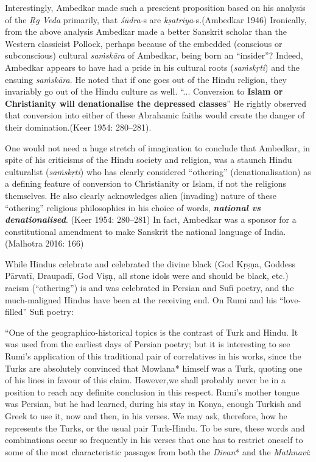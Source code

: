 Interestingly, Ambedkar made such a prescient proposition based on his analysis of the \textit{Ṛg Veda} primarily, that \textit{śūdra}-s are \textit{kṣatriya}-s.\break (Ambedkar 1946) Ironically, from the above analysis Ambedkar made a better Sanskrit scholar than the Western classicist Pollock, perhaps because of the embedded (conscious or subconscious) cultural \textit{saṁskāra} of Ambedkar, being born an “insider”? Indeed, Ambedkar appears to have had a pride in his cultural roots (\textit{saṁskṛti}) and the ensuing \textit{saṁskāra}. He noted that if one goes out of the Hindu religion, they invariably go out of the Hindu culture as well. “... Conversion to \textbf{Islam or Christianity will denationalise the depressed classes}” He rightly observed that conversion into either of these Abrahamic faiths would create the danger of their domination.(Keer 1954: 280–281).

One would not need a huge stretch of imagination to conclude that Ambedkar, in spite of his criticisms of the Hindu society and religion, was a staunch Hindu culturalist (\textit{saṁskṛti}) who has clearly considered “othering” (denationalisation) as a defining feature of conversion to Christianity or Islam, if not the religions themselves. He also clearly acknowledges alien (invading) nature of these “othering” religious philosophies in his choice of words, \textit{\textbf{national vs denationalised}}. (Keer 1954: 280–281) In fact, Ambedkar was a sponsor for a constitutional amendment to make Sanskrit the national language of India. (Malhotra 2016: 166)

While Hindus celebrate and celebrated the divine black (God Kṛṣṇa, Goddess Pārvatī, Draupadī, God Viṣṇ, all stone idols were and should be black, etc.) racism (“othering”) is and was celebrated in Persian and Sufi poetry, and the much-maligned Hindus have been at the receiving end. On Rumi and his “love-filled” Sufi poetry:

\begin{myquote}
“One of the geographico-historical topics is the contrast of Turk and Hindu. It was used from the earliest days of Persian poetry; but it is interesting to see Rumi's application of this traditional pair of correlatives in his works, since the Turks are absolutely convinced that Mowlana* himself was a Turk, quoting one of his lines in favour of this claim. However,we shall probably never be in a position to reach any definite conclusion in this respect. Rumi's mother tongue was Persian, but he had learned, during his stay in Konya, enough Turkish and Greek to use it, now and then, in his verses. We may ask, therefore, how he represents the Turks, or the usual pair Turk-Hindu. To be sure, these words and combinations occur so frequently in his verses that one has to restrict oneself to some of the most characteristic passages from both the \textit{Divan}* and the \textit{Mathnavi}:
\end{myquote}

